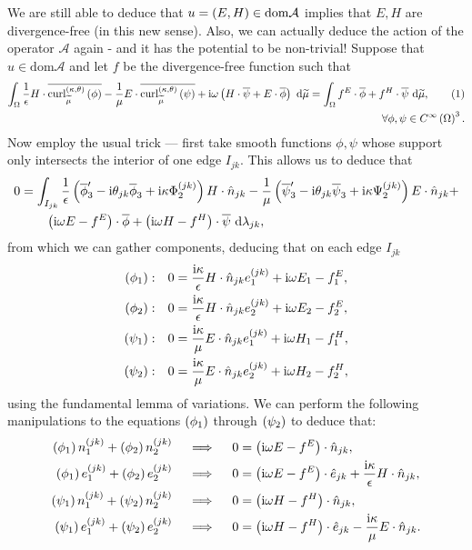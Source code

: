 \documentclass[11pt]{report}
\newcommand\labelthis{\addtocounter{equation}{1}\tag{\theequation}}
\renewcommand{\ktcurl}[1]{\mathrm{curl}^{\kt}_{\dddmes}\bracs{#1}}
\newcommand{\aop}{\mathcal{A}}
\begin{document}
We are still able to deduce that $u=\bracs{E,H}\in\mathrm{dom}\aop$ implies that $E,H$ are divergence-free (in this new sense).
Also, we can actually deduce the action of the operator $\aop$ again - and it has the potential to be non-trivial!
Suppose that $u\in\mathrm{dom}\aop$ and let $f$ be the divergence-free function such that
\begin{align*}
	\integral{\ddom}{ \recip{\epsilon}H\cdot\overline{\ktcurl{\phi}} - \recip{\mu}E\cdot\overline{\ktcurl{\psi}} + \rmi\omega\bracs{H\cdot\overline{\psi} + E\cdot\overline{\phi}} }{\dddmes}
	= \integral{\ddom}{f^E\cdot\overline{\phi} + f^H\cdot\overline{\psi}}{\dddmes}, \labelthis\label{eq:OperatorWeakForm} \\
	\forall\phi,\psi\in\smooth{\ddom}^3.
\end{align*}
Now employ the usual trick --- first take smooth functions $\phi, \psi$ whose support only intersects the interior of one edge $I_{jk}$.
This allows us to deduce that
\begin{align*}
	0 &= \int_{I_{jk}} \frac{1}{\epsilon}\left( \overline{\phi}_3' - \mathrm{i}\theta_{jk}\overline{\phi}_3 + \mathrm{i}\kappa\Phi^{(jk)}_2 \right)H\cdot\hat{n}_{jk} - \frac{1}{\mu}\left( \overline{\psi}_3' - \mathrm{i}\theta_{jk}\overline{\psi}_3 + \mathrm{i}\kappa\Psi^{(jk)}_2 \right)E\cdot\hat{n}_{jk} + \\
	&\qquad \left( \mathrm{i}\omega E - f^E \right)\cdot\overline{\phi} + \left( \mathrm{i}\omega H - f^H \right)\cdot\overline{\psi}  \ \mathrm{d}\lambda_{jk},
\end{align*}
from which we can gather components, deducing that on each edge $I_{jk}$
\begin{align*}
	\left( \phi_1 \right): \quad & 0 = \frac{\mathrm{i}\kappa}{\epsilon}H\cdot\hat{n}_{jk} e^{(jk)}_1 + \mathrm{i}\omega E_1 - f^E_1, \\
	\left( \phi_2 \right): \quad & 0 = \frac{\mathrm{i}\kappa}{\epsilon}H\cdot\hat{n}_{jk} e^{(jk)}_2 + \mathrm{i}\omega E_2 - f^E_2, \\
	\left( \psi_1 \right): \quad & 0 = \frac{\mathrm{i}\kappa}{\mu}E\cdot\hat{n}_{jk} e^{(jk)}_1 + \mathrm{i}\omega H_1 - f^H_1, \\
	\left( \psi_2 \right): \quad & 0 = \frac{\mathrm{i}\kappa}{\mu}E\cdot\hat{n}_{jk} e^{(jk)}_2 + \mathrm{i}\omega H_2 - f^H_2,
\end{align*}
using the fundamental lemma of variations.
We can perform the following manipulations to the equations $\left( \phi_1 \right)$ through $\left( \psi_2 \right)$ to deduce that:
\begin{align*}
	\left( \phi_1 \right)n^{(jk)}_1 + \left( \phi_2 \right)n^{(jk)}_2
	&\quad\implies\quad 0 = \left( \mathrm{i}\omega E - f^E \right)\cdot\hat{n}_{jk}, \\
	\left( \phi_1 \right)e^{(jk)}_1 + \left( \phi_2 \right)e^{(jk)}_2
	&\quad\implies\quad 0 = \left( \mathrm{i}\omega E - f^E \right)\cdot\hat{e}_{jk} + \frac{\mathrm{i}\kappa}{\epsilon}H\cdot\hat{n}_{jk}, \\
	\left( \psi_1 \right)n^{(jk)}_1 + \left( \psi_2 \right)n^{(jk)}_2
	&\quad\implies\quad 0 = \left( \mathrm{i}\omega H - f^H \right)\cdot\hat{n}_{jk}, \\
	\left( \psi_1 \right)e^{(jk)}_1 + \left( \psi_2 \right)e^{(jk)}_2
	&\quad\implies\quad 0 = \left( \mathrm{i}\omega H - f^H \right)\cdot\hat{e}_{jk} - \frac{\mathrm{i}\kappa}{\mu}E\cdot\hat{n}_{jk}.
\end{align*}
\end{document}
